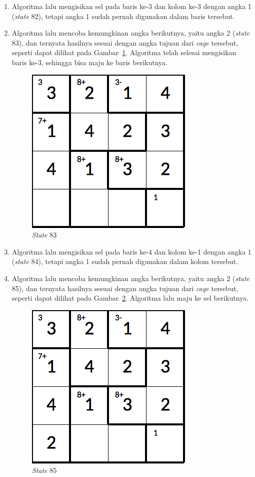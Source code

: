 \begin{enumerate}
\item Algoritma lalu mengisikan sel pada baris ke-3 dan kolom ke-3 dengan angka 1 (\textit{state} 82), tetapi angka 1 sudah pernah digunakan dalam baris tersebut.
\item Algoritma lalu mencoba kemungkinan angka berikutnya, yaitu angka 2 (\textit{state} 83), dan ternyata hasilnya sesuai dengan angka tujuan dari \textit{cage} tersebut, seperti dapat dilihat pada Gambar~\ref{fig:lampiranbt28}. Algoritma telah selesai mengisikan baris ke-3, sehingga bisa maju ke baris berikutnya.

\begin{figure}
\centering
\captionsetup{justification=centering}
\includegraphics[scale=0.333]{Gambar/backtracking/State83}
\caption[\textit{State} 83]{\textit{State} 83}
\label{fig:lampiranbt28}
\end{figure}

\item Algoritma lalu mengisikan sel pada baris ke-4 dan kolom ke-1 dengan angka 1 (\textit{state} 84), tetapi angka 1 sudah pernah digunakan dalam kolom tersebut.
\item Algoritma lalu mencoba kemungkinan angka berikutnya, yaitu angka 2 (\textit{state} 85), dan ternyata hasilnya sesuai dengan angka tujuan dari \textit{cage} tersebut, seperti dapat dilihat pada Gambar~\ref{fig:lampiranbt29}. Algoritma lalu maju ke sel berikutnya.

\begin{figure}
\centering
\captionsetup{justification=centering}
\includegraphics[scale=0.333]{Gambar/backtracking/State85}
\caption[\textit{State} 85]{\textit{State} 85}
\label{fig:lampiranbt29}
\end{figure}


\end{enumerate}
